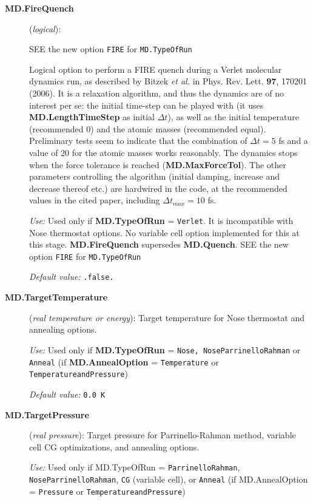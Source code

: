 \documentclass[11pt]{article}
\begin{document}
\begin{description}
\item[{\bf MD.FireQuench}] ({\it logical}): 

 SEE the new option {\tt FIRE} for {\tt MD.TypeOfRun}

Logical option to perform a FIRE quench during a Verlet molecular dynamics
run, as described by Bitzek {\it et al.} in Phys. Rev. Lett. {\bf 97},
170201 (2006). It is a relaxation algorithm, and thus the dynamics
are of no interest per se: the initial time-step can be played with
(it uses {\bf MD.LengthTimeStep} as initial $\Delta t$),
as well as the initial temperature (recommended 0) and the atomic
masses (recommended equal). Preliminary tests seem to indicate that 
the combination of $\Delta t = 5$ fs and a value of 20 for the atomic 
masses works reasonably. The dynamics stops when the force
tolerance is reached ({\bf MD.MaxForceTol}). The other
parameters controlling the algorithm (initial damping, 
increase and decrease thereof etc.) are hardwired in the code,
at the recommended values in the cited paper,
including $\Delta t_{max} = 10$ fs.

{\it Use:} Used only if {\bf MD.TypeOfRun} = {\tt Verlet}. 
It is incompatible with Nose thermostat options. No variable
cell option implemented for this at this stage.
{\bf MD.FireQuench} supersedes {\bf MD.Quench}.  SEE the new
option {\tt FIRE} for {\tt MD.TypeOfRun}

{\it Default value:} {\tt .false.}

\item[{\bf MD.TargetTemperature}] ({\it real temperature or energy}): 
Target temperature for Nose thermostat and annealing options.

{\it Use:} Used only if {\bf MD.TypeOfRun} = {\tt Nose, NoseParrinelloRahman}
or {\tt Anneal} (if {\bf MD.AnnealOption} = {\tt Temperature} or 
{\tt TemperatureandPressure})

{\it Default value:} {\tt 0.0 K}

\item[{\bf MD.TargetPressure}] ({\it real pressure}): 
Target pressure for Parrinello-Rahman method, variable cell CG optimizations,
and annealing options.

{\it Use:} Used only if MD.TypeOfRun = 
{\tt ParrinelloRahman}, {\tt NoseParrinelloRahman},
{\tt CG} (variable cell), or {\tt Anneal} 
(if MD.AnnealOption = {\tt Pressure} or {\tt TemperatureandPressure})


\end{description}
\end{document}
